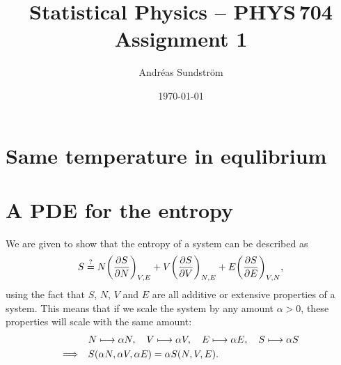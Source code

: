 \documentclass[11pt,letter, swedish, english
]{article}
\begin{document}
\title{Statistical Physics -- PHYS\,704 \\
Assignment 1}
\author{Andréas Sundström}
\date{\today}

\maketitle



\section{Same temperature in equlibrium}


\section{A PDE for the entropy}
We are given to show that the entropy of a system can be described as
\begin{equation}
S \stackrel{?}{=} N\qty(\pdv{S}{N})_{V,E} 
+ V\qty(\pdv{S}{V})_{N,E}
+ E\qty(\pdv{S}{E})_{V,N},
\end{equation}
using the fact that $S$, $N$, $V$ and $E$ are all additive or
extensive properties of a system. This means that if we scale the
system by any amount $\alpha>0$, these properties will scale with the
same amount:
\begin{align}
&N\longmapsto\alpha N\qcomma V\longmapsto \alpha V 
\qcomma E\longmapsto \alpha E\qcomma S\longmapsto \alpha S\\
\label{eq:scale_S}
\Longrightarrow\quad& S(\alpha N, \alpha V, \alpha E) = \alpha S(N, V, E).
\end{align}
\end{document}
